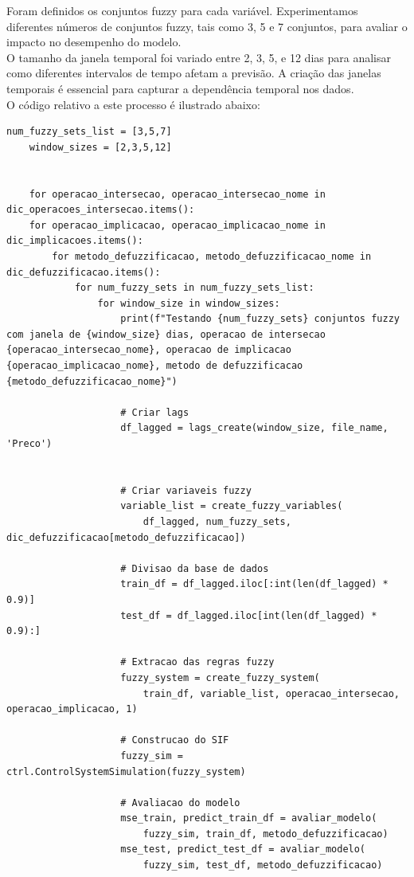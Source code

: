 \documentclass[a4paper, 12pt]{article}
\begin{document}
Foram definidos os conjuntos fuzzy para cada variável. Experimentamos diferentes números de conjuntos fuzzy, tais como 3, 5 e 7 conjuntos, para avaliar o impacto no desempenho do modelo.\\

O tamanho da janela temporal foi variado entre 2, 3, 5, e 12 dias para analisar como diferentes intervalos de tempo afetam a previsão. A criação das janelas temporais é essencial para capturar a dependência temporal nos dados.\\

O código relativo a este processo é ilustrado abaixo:\\


\begin{lstlisting}[style=python]
    num_fuzzy_sets_list = [3,5,7]
    window_sizes = [2,3,5,12]


    for operacao_intersecao, operacao_intersecao_nome in dic_operacoes_intersecao.items():
    for operacao_implicacao, operacao_implicacao_nome in dic_implicacoes.items():
        for metodo_defuzzificacao, metodo_defuzzificacao_nome in dic_defuzzificacao.items():
            for num_fuzzy_sets in num_fuzzy_sets_list:
                for window_size in window_sizes:
                    print(f"Testando {num_fuzzy_sets} conjuntos fuzzy com janela de {window_size} dias, operacao de intersecao {operacao_intersecao_nome}, operacao de implicacao {operacao_implicacao_nome}, metodo de defuzzificacao {metodo_defuzzificacao_nome}")

                    # Criar lags
                    df_lagged = lags_create(window_size, file_name, 'Preco')


                    # Criar variaveis fuzzy
                    variable_list = create_fuzzy_variables(
                        df_lagged, num_fuzzy_sets, dic_defuzzificacao[metodo_defuzzificacao])

                    # Divisao da base de dados
                    train_df = df_lagged.iloc[:int(len(df_lagged) * 0.9)]
                    test_df = df_lagged.iloc[int(len(df_lagged) * 0.9):]

                    # Extracao das regras fuzzy
                    fuzzy_system = create_fuzzy_system(
                        train_df, variable_list, operacao_intersecao, operacao_implicacao, 1)

                    # Construcao do SIF
                    fuzzy_sim = ctrl.ControlSystemSimulation(fuzzy_system)

                    # Avaliacao do modelo
                    mse_train, predict_train_df = avaliar_modelo(
                        fuzzy_sim, train_df, metodo_defuzzificacao)
                    mse_test, predict_test_df = avaliar_modelo(
                        fuzzy_sim, test_df, metodo_defuzzificacao)


\end{lstlisting}
\end{document}
